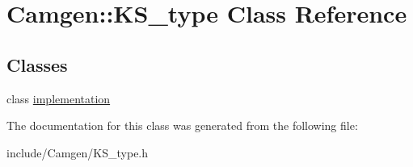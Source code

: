 \hypertarget{a00322}{}\section{Camgen\+:\+:K\+S\+\_\+type Class Reference}
\label{a00322}
\subsection*{Classes}
\begin{DoxyCompactItemize}
\item 
class \hyperlink{a00293}{implementation}
\end{DoxyCompactItemize}


The documentation for this class was generated from the following file\+:\begin{DoxyCompactItemize}
\item 
include/\+Camgen/K\+S\+\_\+type.\+h\end{DoxyCompactItemize}
